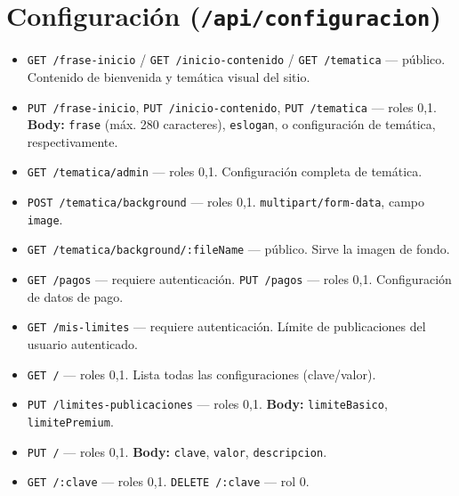 \section{Configuración (\texttt{/api/configuracion})}
\begin{itemize}
    \item \texttt{GET /frase-inicio} / \texttt{GET /inicio-contenido} / \texttt{GET /tematica} — público. Contenido de bienvenida y temática visual del sitio.
    \item \texttt{PUT /frase-inicio}, \texttt{PUT /inicio-contenido}, \texttt{PUT /tematica} — roles 0,1. \textbf{Body:} \texttt{frase} (máx. 280 caracteres), \texttt{eslogan}, o configuración de temática, respectivamente.
    \item \texttt{GET /tematica/admin} — roles 0,1. Configuración completa de temática.
    \item \texttt{POST /tematica/background} — roles 0,1. \texttt{multipart/form-data}, campo \texttt{image}.
    \item \texttt{GET /tematica/background/:fileName} — público. Sirve la imagen de fondo.
    \item \texttt{GET /pagos} — requiere autenticación. \texttt{PUT /pagos} — roles 0,1. Configuración de datos de pago.
    \item \texttt{GET /mis-limites} — requiere autenticación. Límite de publicaciones del usuario autenticado.
    \item \texttt{GET /} — roles 0,1. Lista todas las configuraciones (clave/valor).
    \item \texttt{PUT /limites-publicaciones} — roles 0,1. \textbf{Body:} \texttt{limiteBasico}, \texttt{limitePremium}.
    \item \texttt{PUT /} — roles 0,1. \textbf{Body:} \texttt{clave}, \texttt{valor}, \texttt{descripcion}.
    \item \texttt{GET /:clave} — roles 0,1. \texttt{DELETE /:clave} — rol 0.
\end{itemize}

